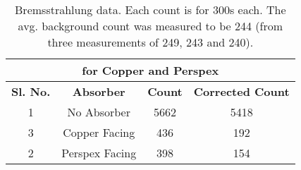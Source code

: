 \begin{table}
{\begin{tabular}{cccc}
\multicolumn{4}{|c|}{\textbf{for Copper and   Perspex}}                                                                                                               \\ \hline
\multicolumn{1}{|c|}{\textbf{Sl. No.}} & \multicolumn{1}{c|}{\textbf{Absorber}} & \multicolumn{1}{c|}{\textbf{Count}} & \multicolumn{1}{c|}{\textbf{Corrected Count}} \\ \hline
\multicolumn{1}{|c|}{1}                & \multicolumn{1}{c|}{No Absorber}       & \multicolumn{1}{c|}{5662}           & \multicolumn{1}{c|}{5418}                     \\ \hline
\multicolumn{1}{|c|}{3}                & \multicolumn{1}{c|}{Copper Facing}     & \multicolumn{1}{c|}{436}            & \multicolumn{1}{c|}{192}                      \\ \hline
\multicolumn{1}{|c|}{2}                & \multicolumn{1}{c|}{Perspex Facing}    & \multicolumn{1}{c|}{398}            & \multicolumn{1}{c|}{154}                      \\ \hline
		\end{tabular}%
	}
	\caption{Bremsstrahlung data. Each count is for 300s each. The avg. background count was measured to be 244 (from three measurements of 249, 243 and 240).}
	\label{tab:3}
\end{table}